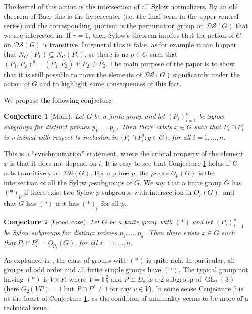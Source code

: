\documentclass[11pt]{amsart}
\numberwithin{equation}{section}
\newtheorem{conjecture}{Conjecture}
\theoremstyle{definition}
\theoremstyle{remark}
\newcommand{\GL}{\mathop{\mathrm{GL}}}
\newcommand{\DS}{\mathcal{DS}}
\begin{document}
The kernel of this action is the intersection of all Sylow normalizers.
By an old theorem of Baer \cite{Bae53} this is the hypercenter
(i.e. the final term in the upper central series)
and the corresponding quotient is the permutation group on $\DS(G)$ that we are interested in.
If $r=1$, then Sylow's theorem implies that
the action of $G$ on $\DS(G)$ is transitive.
In general this is false, as for example it can happen that $N_G(P_1) \subseteq N_G(P_2)$, so there is no $g \in G$ such that $(P_1,P_2)^g = (P_1,\overline{P_2})$ if $P_2 \neq \overline{P_2}$.
The main purpose of the paper is to show that
it is still possible to move the elements of $\DS(G)$ significantly under the action of $G$
and to highlight some consequences of this fact.

We propose the following conjecture:

\begin{conjecture}[Main] \label{conj:A}
Let $G$ be a finite group and let $(P_i)_{i=1}^n$ be Sylow subgroups for distinct primes $p_1,\ldots,p_n$.
Then there exists $x \in G$ such that $P_i \cap P_i^x$ is minimal with respect to inclusion in $\{ P_i \cap P_i^g : g \in G\}$,
for all $i=1,\ldots,n$.
\end{conjecture} 

This is a ``synchronization'' statement,
where the crucial property of the element $x$ is that it does not depend on $i$.
It is easy to see that Conjecture \ref{conj:A} holds if $G$ acts transitively on $\DS(G)$.
For a prime $p$, the $p$-core $O_p(G)$ is the intersection of all the Sylow $p$-subgroups of $G$.
We say that a finite group $G$ has $(*)_p$
if there exist two Sylow $p$-subgroups with intersection in $O_p(G)$,
and that $G$ has $(*)$ if it has $(*)_p$ for all $p$.

\begin{conjecture}[Good case] \label{conj:B}
Let $G$ be a finite group with $(*)$ and let $(P_i)_{i=1}^n$ be Sylow subgroups for distinct primes $p_1,\ldots,p_n$.
Then there exists $x \in G$ such that $P_i \cap P_i^x = O_{p_i}(G)$, for all $i=1,\ldots,n$.
\end{conjecture} 

As explained in \cite[Th. B]{Zen96}, the class of groups with $(*)$ is quite rich.
In particular, all groups of odd order \cite{Ito58} and all finite simple groups \cite{MZ96} have $(*)$.
The typical group not having $(*)$ is $V \rtimes P$,
where $V=\mathbb{F}_3^2$ and $P \cong D_8$ is a $2$-subgroup of $\GL_2(3)$
(here $O_2(VP)=1$ but $P \cap P^v \neq 1$ for any $v \in V$).
In some sense Conjecture \ref{conj:B} is at the heart of Conjecture \ref{conj:A},
as the condition of minimality seems to be more of a technical issue.
\end{document}
